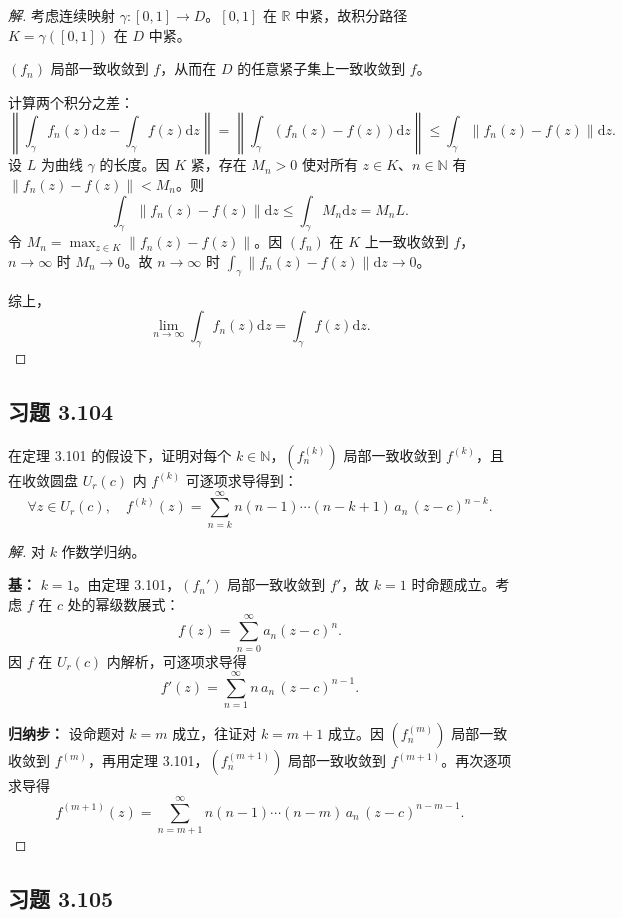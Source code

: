 \documentclass[11pt,a4paper]{article}
\newcommand{\R}{\mathbb{R}}
\newcommand{\N}{\mathbb{N}}
\newcommand{\dd}{\mathrm{d}}
\theoremstyle{definition}
\newenvironment{solution}{\begin{proof}[解]}{\end{proof}}
\begin{document}
\begin{solution}
  考虑连续映射 $\gamma: [0,1] \to D$。$[0,1]$ 在 $\R$ 中紧，故积分路径 $K = \gamma([0,1])$ 在 $D$ 中紧。

  $(f_n)$ 局部一致收敛到 $f$，从而在 $D$ 的任意紧子集上一致收敛到 $f$。

  计算两个积分之差：
  \[
    \left\|\int_\gamma f_n(z) \dd z - \int_\gamma f(z) \dd z\right\|
    = \left\|\int_\gamma (f_n(z) - f(z)) \dd z\right\| \le
    \int_\gamma \|f_n(z) - f(z)\| \dd z.
  \]
  设 $L$ 为曲线 $\gamma$ 的长度。因 $K$ 紧，存在 $M_n > 0$ 使对所有 $z \in K$、$n \in \N$ 有 $\|f_n(z) - f(z)\| < M_n$。则
  \[
    \int_\gamma \|f_n(z) - f(z)\| \dd z
    \le \int_\gamma M_n \dd z = M_n L.
  \]
  令 $M_n = \max_{z \in K} \|f_n(z) - f(z)\|$。因 $(f_n)$ 在 $K$ 上一致收敛到 $f$，$n\to\infty$ 时 $M_n \to 0$。故 $n\to\infty$ 时 $\int_\gamma \|f_n(z) - f(z)\| \dd z \to 0$。

  综上，
  \[
    \lim_{n\to\infty} \int_\gamma f_n(z)\dd z
    = \int_\gamma f(z)\dd z.
  \]
\end{solution}

\subsection{习题 3.104}

在定理 3.101 的假设下，证明对每个 $k \in \N$，$(f_n^{(k)})$ 局部一致收敛到 $f^{(k)}$，且在收敛圆盘 $U_r(c)$ 内 $f^{(k)}$ 可逐项求导得到：
\[
  \forall z \in U_r(c),\quad
  f^{(k)}(z)
  = \sum_{n=k}^{\infty} n(n-1)\cdots(n-k+1)\,a_n\,(z-c)^{n-k}.
\]

\begin{solution}
  对 $k$ 作数学归纳。

  \textbf{基：} $k = 1$。由定理 3.101，$(f_n')$ 局部一致收敛到 $f'$，故 $k=1$ 时命题成立。考虑 $f$ 在 $c$ 处的幂级数展式：
  \[
    f(z) = \sum_{n=0}^{\infty} a_n (z-c)^n.
  \]
  因 $f$ 在 $U_r(c)$ 内解析，可逐项求导得
  \[
    f'(z) = \sum_{n=1}^{\infty} n\,a_n\,(z-c)^{n-1}.
  \]

  \textbf{归纳步：} 设命题对 $k = m$ 成立，往证对 $k = m + 1$ 成立。因 $(f_n^{(m)})$ 局部一致收敛到 $f^{(m)}$，再用定理 3.101，$(f_n^{(m+1)})$ 局部一致收敛到 $f^{(m+1)}$。再次逐项求导得
  \[
    f^{(m+1)}(z) = \sum_{n=m+1}^{\infty} n(n-1)\cdots(n-m)\,a_n\,(z-c)^{n-m-1}.
  \]
\end{solution}

\subsection{习题 3.105}
\end{document}
